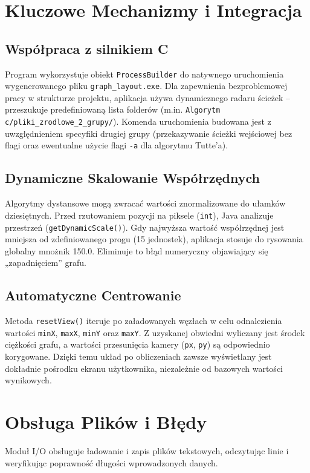 \documentclass[12pt, a4paper]{article}
\begin{document}
\section{Kluczowe Mechanizmy i Integracja}

\subsection{Współpraca z silnikiem C}
Program wykorzystuje obiekt \texttt{ProcessBuilder} do natywnego uruchomienia wygenerowanego pliku \texttt{graph\_layout.exe}. 
Dla zapewnienia bezproblemowej pracy w strukturze projektu, aplikacja używa dynamicznego radaru ścieżek – przeszukuje predefiniowaną lista folderów (m.in. \texttt{Algorytm c/pliki\_zrodlowe\_2\_grupy/}). Komenda uruchomienia budowana jest z uwzględnieniem specyfiki drugiej grupy (przekazywanie ścieżki wejściowej bez flagi oraz ewentualne użycie flagi \texttt{-a} dla algorytmu Tutte'a).

\subsection{Dynamiczne Skalowanie Współrzędnych}
Algorytmy dystansowe mogą zwracać wartości znormalizowane do ułamków dziesiętnych. Przed rzutowaniem pozycji na piksele (\texttt{int}), Java analizuje przestrzeń (\texttt{getDynamicScale()}). Gdy najwyższa wartość współrzędnej jest mniejsza od zdefiniowanego progu (15 jednostek), aplikacja stosuje do rysowania globalny mnożnik 150.0. Eliminuje to błąd numeryczny objawiający się „zapadnięciem” grafu.

\subsection{Automatyczne Centrowanie}
Metoda \texttt{resetView()} iteruje po załadowanych węzłach w celu odnalezienia wartości \texttt{minX}, \texttt{maxX}, \texttt{minY} oraz \texttt{maxY}. Z uzyskanej obwiedni wyliczany jest środek ciężkości grafu, a wartości przesunięcia kamery (\texttt{px}, \texttt{py}) są odpowiednio korygowane. Dzięki temu układ po obliczeniach zawsze wyświetlany jest dokładnie pośrodku ekranu użytkownika, niezależnie od bazowych wartości wynikowych.

\section{Obsługa Plików i Błędy}
Moduł I/O obsługuje ładowanie i zapis plików tekstowych, odczytując linie i weryfikując poprawność długości wprowadzonych danych.
\end{document}
